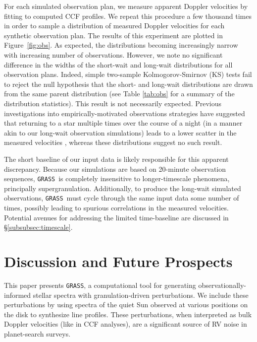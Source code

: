 \documentclass[twocolumn]{aastex63}
\newcommand{\grass}{\texttt{GRASS}}
\newcommand{\revise}[1]{#1}
\newcommand{\revisetwo}[1]{#1}
\begin{document}
For each simulated observation plan, we measure apparent Doppler velocities by fitting to computed CCF profiles. We repeat this procedure \revisetwo{a few thousand times} in order to sample a distribution of measured Doppler velocities for each synthetic observation plan. The results of this experiment are plotted in Figure~\ref{fig:obs}. As expected, the distributions becoming increasingly narrow with increasing number of observations. \revisetwo{However, we note no significant difference in the widths of the short-wait and long-wait distributions for all observation plans. Indeed, simple two-sample Kolmogorov-Smirnov (KS) tests fail to reject the null hypothesis that the short- and long-wait distributions are drawn from the same parent distribution (see Table \ref{tab:obs} for a summary of the distribution statistics).} This result is not necessarily expected. Previous investigations into empirically-motivated observations strategies have suggested that returning to a star multiple times over the course of a night \revisetwo{(in a manner akin to our long-wait observation simulations)} leads \revisetwo{to a lower scatter in the measured velocities} \citep[e.g.,][]{Dumusque2011, Meunier2015, CollierCameron2019}\revisetwo{, whereas these distributions suggest no such result.} \par 

\revise{The short baseline of our input data is likely responsible for this apparent discrepancy. Because our simulations are based on 20-minute observation sequences, \grass\ is completely insensitive to longer-timescale phenomena, principally supergranulation. Additionally, to produce the long-wait simulated observations, \grass\ must cycle through the same input data some number of times, possibly leading to spurious correlations in the measured velocities.} Potential avenues for addressing the limited time-baseline are discussed in \S\ref{subsubsec:timescale}. \par 



\section{Discussion and Future Prospects} \label{discussion}
This paper presents \grass, a computational tool for generating observationally-informed stellar spectra with granulation-driven perturbations. We include these perturbations by using spectra of the quiet Sun observed at various positions on the disk to synthesize line profiles. These perturbations, when interpreted as bulk Doppler velocities (like in CCF analyses), are a significant source of RV noise in planet-search surveys. \par
\end{document}
